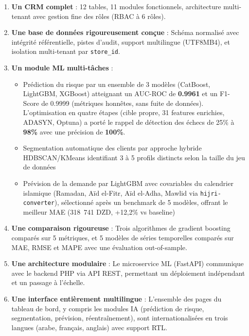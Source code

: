\documentclass[12pt,a4paper]{report}
\begin{document}
\begin{enumerate}
  \item \textbf{Un CRM complet} : 12 tables, 11 modules fonctionnels, architecture multi-tenant avec gestion fine des r\^{o}les (RBAC \`{a} 6 r\^{o}les).

  \item \textbf{Une base de donn\'{e}es rigoureusement con\c{c}ue} : Sch\'{e}ma normalis\'{e} avec int\'{e}grit\'{e} r\'{e}f\'{e}rentielle, pistes d'audit, support multilingue (UTF8MB4), et isolation multi-tenant par \texttt{store\_id}.

  \item \textbf{Un module ML multi-t\^{a}ches} :
  \begin{itemize}
    \item Pr\'{e}diction du risque par un ensemble de 3 mod\`{e}les (CatBoost, LightGBM, XGBoost) atteignant un AUC-ROC de \textbf{0.9961} et un F1-Score de 0.9999 (m\'{e}triques honn\^{e}tes, sans fuite de donn\'{e}es). L'optimisation en quatre \'{e}tapes (cible propre, 31 features enrichies, ADASYN, Optuna) a port\'{e} le rappel de d\'{e}tection des \'{e}checs de 25\% \`{a} \textbf{98\%} avec une pr\'{e}cision de \textbf{100\%}.
    \item Segmentation automatique des clients par approche hybride HDBSCAN/KMeans identifiant 3 \`{a} 5 profils distincts selon la taille du jeu de donn\'{e}es
    \item Pr\'{e}vision de la demande par LightGBM avec covariables du calendrier islamique (Ramadan, A\"{i}d el-Fitr, A\"{i}d el-Adha, Mawlid via \texttt{hijri-converter}), s\'{e}lectionn\'{e} apr\`{e}s un benchmark de 5 mod\`{e}les, offrant le meilleur MAE (318~741 DZD, +12,2\% vs baseline)
  \end{itemize}

  \item \textbf{Une comparaison rigoureuse} : Trois algorithmes de gradient boosting compar\'{e}s sur 5 m\'{e}triques, et 5 mod\`{e}les de s\'{e}ries temporelles compar\'{e}s sur MAE, RMSE et MAPE avec une \'{e}valuation out-of-sample.

  \item \textbf{Une architecture modulaire} : Le microservice ML (FastAPI) communique avec le backend PHP via API REST, permettant un d\'{e}ploiement ind\'{e}pendant et un passage \`{a} l'\'{e}chelle.

  \item \textbf{Une interface enti\`{e}rement multilingue} : L'ensemble des pages du tableau de bord, y compris les modules IA (pr\'{e}diction de risque, segmentation, pr\'{e}vision, r\'{e}entra\^{i}nement), sont internationalis\'{e}es en trois langues (arabe, fran\c{c}ais, anglais) avec support RTL.
\end{enumerate}
\end{document}
